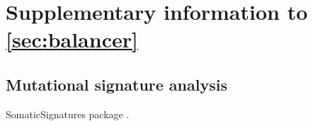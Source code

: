 \chapter{Supplementary information to \cref{sec:balancer}}
\label{sec:suppl_balancer}

\section{Mutational signature analysis}
\label{sec:mutsign}

SomaticSignatures package \citep{Gehring2015}.
